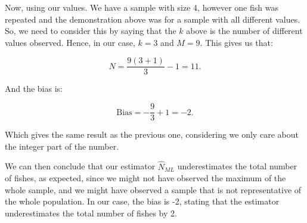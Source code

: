 \documentclass[12pt,a4paper,oneside]{paper}
\begin{document}
Now, using our values. We have a sample with size 4, however one fish was repeated and the demonstration above
was for a sample with all different values. So, we need to consider this by saying that the $k$ above is the number of different values observed.
Hence, in our case, $k = 3$ and $M = 9$.
This gives us that:

\[
N = \frac{9(3 + 1)}{3} - 1 = 11.
\]

And the bias is:

\[
\text{Bias} = - \frac{9}{3} + 1 = -2.
\]

Which gives the same result as the previous one, considering we only care about the integer part of the number.


We can then conclude that our estimator $\hat{N}_{ML}$ underestimates the total number of fishes, as expected,
since we might not have observed the maximum of the whole sample, and we might have observed a sample that is not representative of the whole population.
In our case, the bias is -2, stating that the estimator underestimates the total number of fishes by 2.






\clearpage

\appendix


\newpage
\printbibliography
\end{document}
